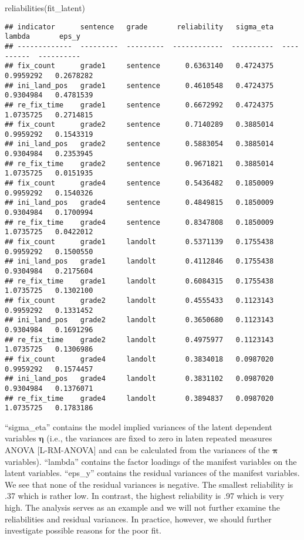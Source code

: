 \documentclass[
]{book}
\newenvironment{Shaded}{\begin{snugshade}}{\end{snugshade}}
\newcommand{\FunctionTok}[1]{\textcolor[rgb]{0.00,0.00,0.00}{#1}}
\newcommand{\NormalTok}[1]{#1}
\begin{document}
\begin{Shaded}
\begin{Highlighting}[]
\FunctionTok{reliabilities}\NormalTok{(fit\_latent)}
\end{Highlighting}
\end{Shaded}

\begin{verbatim}
## indicator      sentence   grade       reliability   sigma_eta      lambda       eps_y
## -------------  ---------  ---------  ------------  ----------  ----------  ----------
## fix_count      grade1     sentence      0.6363140   0.4724375   0.9959292   0.2678282
## ini_land_pos   grade1     sentence      0.4610548   0.4724375   0.9304984   0.4781539
## re_fix_time    grade1     sentence      0.6672992   0.4724375   1.0735725   0.2714815
## fix_count      grade2     sentence      0.7140289   0.3885014   0.9959292   0.1543319
## ini_land_pos   grade2     sentence      0.5883054   0.3885014   0.9304984   0.2353945
## re_fix_time    grade2     sentence      0.9671821   0.3885014   1.0735725   0.0151935
## fix_count      grade4     sentence      0.5436482   0.1850009   0.9959292   0.1540326
## ini_land_pos   grade4     sentence      0.4849815   0.1850009   0.9304984   0.1700994
## re_fix_time    grade4     sentence      0.8347808   0.1850009   1.0735725   0.0422012
## fix_count      grade1     landolt       0.5371139   0.1755438   0.9959292   0.1500550
## ini_land_pos   grade1     landolt       0.4112846   0.1755438   0.9304984   0.2175604
## re_fix_time    grade1     landolt       0.6084315   0.1755438   1.0735725   0.1302100
## fix_count      grade2     landolt       0.4555433   0.1123143   0.9959292   0.1331452
## ini_land_pos   grade2     landolt       0.3650680   0.1123143   0.9304984   0.1691296
## re_fix_time    grade2     landolt       0.4975977   0.1123143   1.0735725   0.1306986
## fix_count      grade4     landolt       0.3834018   0.0987020   0.9959292   0.1574457
## ini_land_pos   grade4     landolt       0.3831102   0.0987020   0.9304984   0.1376071
## re_fix_time    grade4     landolt       0.3894837   0.0987020   1.0735725   0.1783186
\end{verbatim}

``sigma\_eta'' contains the model implied variances of the latent dependent variables \(\boldsymbol{\eta}\) (i.e., the variances are fixed to zero in laten repeated measures ANOVA {[}L-RM-ANOVA{]} and can be calculated from the variances of the \(\boldsymbol{\pi}\) variables). ``lambda'' contains the factor loadings of the manifest variables on the latent variables. ``eps\_y'' contains the residual variances of the manifest variables. We see that none of the residual variances is negative. The smallest reliability is .37 which is rather low. In contrast, the highest reliability is .97 which is very high. The analysis serves as an example and we will not further examine the reliabilities and residual variances. In practice, however, we should further investigate possible reasons for the poor fit.
\end{document}
